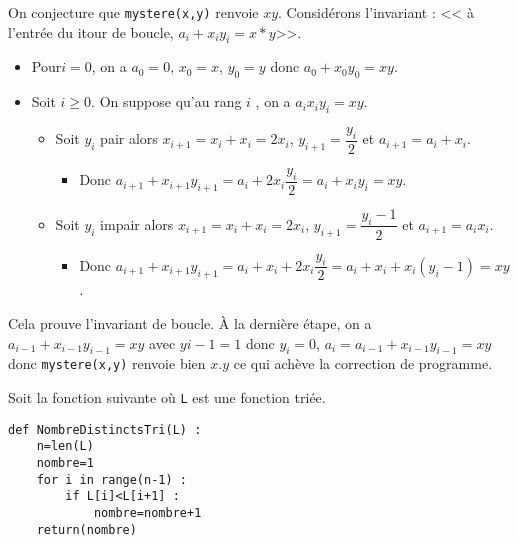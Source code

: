 \begin{multicols}{2}
\ifprof
\begin{corrige}
On conjecture que \texttt{mystere(x,y)} renvoie $xy$.
Considérons l'invariant : << à l’entrée du i\ieme tour de boucle, $a_i+x_i y_i = x *y $>>.
\begin{itemize}
\item Pour$ i=0$, on a $a_0 = 0$, $x_0 = x$, $y_0 = y$ donc $a_0 + x_0 y_0 = xy$.
\item Soit  $i\geq 0$. On suppose qu’au rang $i$ , on a $a_i x_i y_i =xy$.
\begin{itemize}
\item Soit $y_i$  pair alors $x_{i+1}=x_i+x_i = 2x_i$, $y_{i+1}=\dfrac{y_i}{2}$ et $a_{i+1}=a_i +x_i$.
\begin{itemize}
\item Donc $a_{i+1}+x_{i+1}y_{i+1}=a_i+2x_i\dfrac{y_i}{2} = a_i +x_iy_i = xy$.
\end{itemize}
\item Soit $y_i$ impair alors $x_{i+1}=x_i + x_i = 2 x_i$, $y_{i+1}=\dfrac{y_i -1}{2}$ et $a_{i+1}=a_i x_i$.
\begin{itemize}
\item Donc $a_{i+1}+x_{i+1}y_{i+1}=a_i+x_i+2 x_i \dfrac{y_i}{2} = a_i +x_i+x_i\left( y_i -1 \right) = xy$.
\end{itemize}
\end{itemize}
\end{itemize}

Cela prouve l’invariant de boucle.
À la dernière étape, on a $a_{i-1}+x_{i-1}y_{i-1}=xy$ avec $y{i-1}=1$ donc $y_i = 0$, $a_i=a_{i-1}+x_{i-1}y_{i-1} = xy$ donc \texttt{mystere(x,y)} renvoie bien $x.y$ ce qui achève la correction de programme.

\end{corrige}
\else
\fi

\exer{}
\setcounter{numques}{0}

Soit la fonction suivante où \texttt{L} est une fonction triée.
\begin{lstlisting}
def NombreDistinctsTri(L) :
    n=len(L)
    nombre=1
    for i in range(n-1) :
        if L[i]<L[i+1] :
            nombre=nombre+1
    return(nombre)
\end{lstlisting}



\end{multicols}
